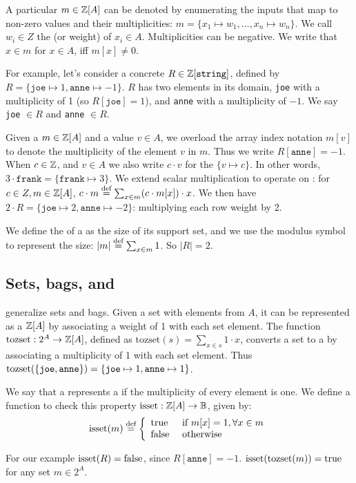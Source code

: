 A particular \zr $m \in \mathbb{Z}[A]$ can be denoted by enumerating the inputs that map to non-zero values and
their multiplicities: 
$m = \{ x_1 \mapsto w_1, \dots, x_n \mapsto w_n \}$.  
We call $w_i \in Z$ the  (or weight)
of $x_i \in A$.  Multiplicities can be negative.  
We write that $x \in m$ for $x \in A$, iff $m[x] \not= 0$.

For example, let's consider a concrete \zr $R \in \mathbb{Z}[\texttt{string}]$,
defined by $R = \{ \texttt{joe} \mapsto 1, \texttt{anne} \mapsto -1 \}$.  
$R$ has two elements in its domain,
\texttt{joe} with a multiplicity of 1 (so $R[\texttt{joe}] = 1$), 
and \texttt{anne} with a multiplicity of $-1$.
We say \texttt{joe} $\in R$ and \texttt{anne} $\in R$.

Given a \zr $m \in \mathbb{Z}[A]$ and a value $v \in A$, we overload the array index notation
$m[v]$ to denote the multiplicity of the element $v$ in $m$.  
Thus we write $R[\texttt{anne}] = -1$.
When $c \in \mathbb{Z}$, and $v \in A$ we also write $c \cdot v$ for the  \zr $\{
v \mapsto c \}$.  In other words, $3 \cdot \texttt{frank} = \{ \texttt{frank} \mapsto 3 \}$.
We extend scalar multiplication to operate on \zrs: for $c \in Z, m \in \mathbb{Z}[A]$, 
$c \cdot m \stackrel{\textrm{\scriptsize def}}{=} \sum_{x \in m} (c \cdot m[x]) \cdot x$.  We then have
$2 \cdot R = \{ \texttt{joe} \mapsto 2, \texttt{anne} \mapsto -2 \}$: multiplying
each row weight by 2.

We define the  of a \zr as the size of its support set, and we use the 
modulus symbol to represent the size: $|m| \stackrel{\textrm{\scriptsize def}}{=} \sum_{x \in m} 1$.  So $|R| = 2$.

\subsection{Sets, bags, and \zrs}

\zrs generalize sets and bags. 
Given a set with elements from $A$, it can be represented as a \zr $\mathbb{Z}[A]$ 
by associating a weight of 1 with each set element.  The function $\mbox{tozset}: 2^A \to \mathbb{Z}[A]$, 
defined as $\mbox{tozset}(s) = \sum_{x \in s} 1 \cdot x$, 
converts a set to a \zr by associating a multiplicity of 1 with each set element.
Thus $\mbox{tozset}(\{ \mbox{\texttt{joe}}, \mbox{\texttt{anne}} \}) = \{ \mbox{\texttt{joe}} \mapsto 1, \mbox{\texttt{anne}} \mapsto 1 \}$.

\begin{definition}
We say that a \zr represents a  if the multiplicity of every
element is one.  We define a function to check this property 
$\mbox{isset} : \mathbb{Z}[A] \rightarrow \mathbb{B}$, given by: 
$$\mbox{isset}(m) \stackrel{\textrm{\scriptsize def}}{=} \left\{
\begin{array}{ll}
  \mbox{true} & \mbox{ if } m[x] = 1, \forall x \in m \\
  \mbox{false} & \mbox{ otherwise}
\end{array}
\right.
$$
\end{definition}
For our example $\mbox{isset}(R) = \mbox{false}$, since $R[\texttt{anne}] = -1$.  
$\mbox{isset}(\mbox{tozset}(m)) = \mbox{true}$ for any set $m \in 2^A$.

